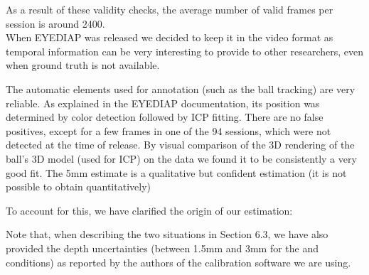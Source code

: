 {{As a result of these validity checks,  the average number of valid frames per session is around 2400.
}\\

When EYEDIAP was released we decided to keep it in the video format as temporal information can be very
interesting to provide to other researchers, even when ground truth is not available.

The automatic elements used for annotation (such as the ball tracking) are very reliable.
As explained in the EYEDIAP documentation, its position was determined by color detection followed by ICP fitting.
There are no false positives, except for a few frames in one of the 94 sessions, which were not detected
at the time of release. By visual comparison of the 3D rendering of the ball's 3D model (used for ICP) on the data we found it to be
consistently a very good fit.
%
The 5mm estimate is a qualitative but confident estimation (it is not possible to obtain quantitatively)

To account for this, we have clarified the origin of our estimation:



Note that, when describing the two situations  in Section 6.3,  we have also provided  the depth uncertainties
(between 1.5mm and 3mm for the \CS and \FT conditions) as reported by the authors of the calibration software we are using.


}



